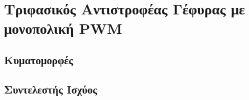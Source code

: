\section{Τριφασικός Αντιστροφέας Γέφυρας με μονοπολική PWM}





\subsection{Κυματομορφές}





\subsection{Συντελεστής Ισχύος}